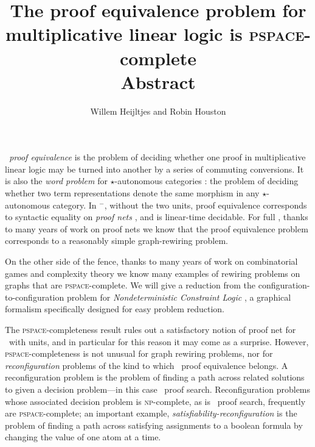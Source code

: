 \documentclass{robinminion}
\author{Willem Heijltjes and Robin Houston}
\title{The proof equivalence problem for multiplicative linear logic is \textsc{pspace}-complete\\[4pt]\large Abstract}
\begin{document}
\maketitle

\linespread{1.1}\selectfont
\noindent\emph{\MLL\ proof equivalence} is the problem of deciding whether one proof in multiplicative linear logic may be turned into another by a series of commuting conversions. It is also the \emph{word problem} for $\star$-autonomous categories \citep{Barr-1991}: the problem of deciding whether two term representations denote the same morphism in any $\star$-autonomous category. In \MLL$^{-}$, without the two units, proof equivalence corresponds to syntactic equality on \emph{proof nets} \citep{Girard87, DR89}, and is linear-time decidable. For full \MLL, thanks to many years of work on proof nets \citep{TrimbleThesis, BCST, Strassburger-Lamarche-2004, HughesFreeStar} we know that the proof equivalence problem corresponds to a reasonably simple graph-rewiring problem.

On the other side of the fence, thanks to many years of work on combinatorial games and complexity theory \citep{RushHour, HearnDemaineTCS, GamesPuzzlesAndComputation, TheConnectivityOfBooleanSatisfiability, ReconfigurationProblems} we know many examples of rewiring problems on graphs that are \textsc{pspace}-complete. We will give a reduction from the configuration-to-configuration problem for \emph{Nondeterministic Constraint Logic} \citep{HearnDemaineTCS, GamesPuzzlesAndComputation}, a graphical formalism specifically designed for easy problem reduction.

The \textsc{pspace}-completeness result rules out a satisfactory notion of proof net for \MLL\ with units, and in particular for this reason it may come as a surprise. However, \textsc{pspace}-completeness is not unusual for graph rewiring problems,  nor for \emph{reconfiguration} problems \citep{ReconfigurationProblems} of the kind to which \MLL\ proof equivalence belongs. A reconfiguration problem is the problem of finding a path across related solutions to given a decision problem---in this case \MLL\ proof search. Reconfiguration problems whose associated decision problem is \textsc{np}-complete, as is \MLL\ proof search, frequently are \textsc{pspace}-complete; an important example, \emph{satisfiability-reconfiguration} \citep{TheConnectivityOfBooleanSatisfiability} is the problem of finding a path across satisfying assignments to a boolean formula by changing the value of one atom at a time.

\small


\end{document}
